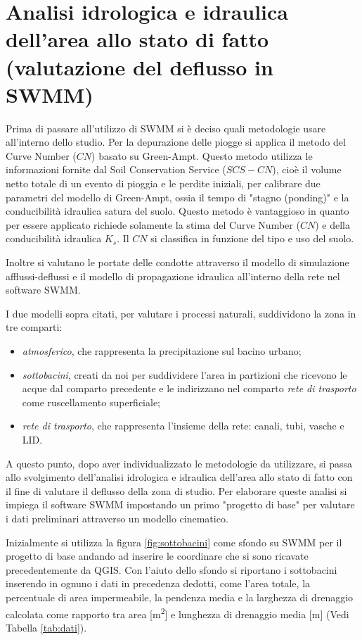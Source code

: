 \chapter{Analisi idrologica e idraulica dell’area allo stato di fatto (valutazione del deflusso in SWMM)}\label{cap:progettoBase}
Prima di passare all'utilizzo di SWMM si è deciso quali metodologie usare all'interno dello studio.
Per la depurazione delle piogge si applica il metodo del Curve Number ($CN$) basato su Green-Ampt. 
Questo metodo utilizza le informazioni fornite dal Soil Conservation Service ($SCS-CN$), cioè il volume netto totale di un evento di pioggia e le perdite iniziali, per calibrare due parametri del modello di Green-Ampt, ossia il tempo di "stagno (ponding)" e la conducibilità idraulica satura del suolo.
Questo metodo è vantaggioso in quanto per essere applicato richiede solamente la stima del Curve Number ($CN$) e della conducibilità idraulica $K_s$. 
Il $CN$ si classifica in funzione del tipo e uso del suolo. 

Inoltre si valutano le portate delle condotte attraverso il modello di simulazione afflussi-deflussi e il modello di propagazione idraulica all'interno della rete nel software SWMM.

I due modelli sopra citati, per valutare i processi naturali, suddividono la zona in tre comparti:
\begin{itemize}
\item \emph{atmosferico}, che rappresenta la precipitazione sul bacino urbano;
\item \emph{sottobacini}, creati da noi per suddividere l'area in partizioni che ricevono le acque dal comparto precedente e le indirizzano nel comparto \emph{rete di trasporto} come ruscellamento superficiale;
\item \emph{rete di trasporto}, che rappresenta l'insieme della rete: canali, tubi, vasche e LID.
\end{itemize}
A questo punto, dopo aver individualizzato le metodologie da utilizzare, si passa allo svolgimento dell'analisi idrologica e idraulica dell'area allo stato di fatto con il fine di valutare il deflusso della zona di studio.
Per elaborare queste analisi si impiega il software SWMM impostando un primo "progetto di base" per valutare i dati preliminari attraverso un modello cinematico.

Inizialmente si utilizza la figura \ref{fig:sottobacini} come sfondo su SWMM per il progetto di base andando ad inserire le coordinare che si sono ricavate precedentemente da QGIS.
Con l'aiuto dello sfondo si riportano i sottobacini inserendo in ognuno i dati in precedenza dedotti, come l'area totale, la percentuale di area impermeabile, la pendenza media e la larghezza di drenaggio calcolata come rapporto tra area [\si{\square\metre}] e lunghezza di drenaggio media [\si{\metre}] (Vedi Tabella \ref{tab:dati}).

